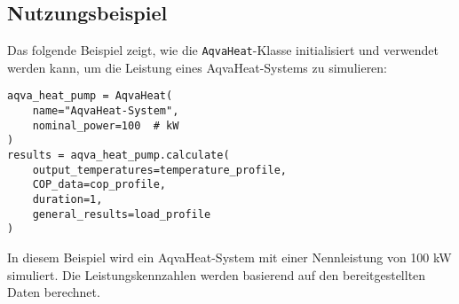 \subsection{Nutzungsbeispiel}
Das folgende Beispiel zeigt, wie die \texttt{AqvaHeat}-Klasse initialisiert und verwendet werden kann, um die Leistung eines AqvaHeat-Systems zu simulieren:

\begin{verbatim}
aqva_heat_pump = AqvaHeat(
    name="AqvaHeat-System", 
    nominal_power=100  # kW
)
results = aqva_heat_pump.calculate(
    output_temperatures=temperature_profile, 
    COP_data=cop_profile, 
    duration=1, 
    general_results=load_profile
)
\end{verbatim}
In diesem Beispiel wird ein AqvaHeat-System mit einer Nennleistung von 100 kW simuliert. Die Leistungskennzahlen werden basierend auf den bereitgestellten Daten berechnet.
